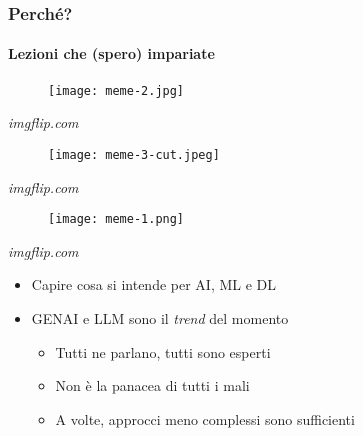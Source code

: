 \begin{frame}[t,fragile] \frametitle{Perché?}
\framesubtitle{Lezioni che (spero) impariate}
{\scriptsize
    \begin{minipage}[b]{\textwidth}
        \begin{minipage}[b]{0.33\textwidth}
            \centering
            \begin{figure}[ht]
                \texttt{[image: meme-2.jpg]}
            \end{figure}
            \begin{flushright}
                \vspace*{-7pt}
                {\tiny\textit{\textcopyright imgflip.com}}
            \end{flushright}
        \end{minipage}
        \begin{minipage}[b]{0.33\textwidth}
            \centering
            \begin{figure}[ht]
                \texttt{[image: meme-3-cut.jpeg]}
            \end{figure}
            \begin{flushright}
                \vspace*{-7pt}
                {\tiny\textit{\textcopyright imgflip.com}}
            \end{flushright}
        \end{minipage}
        \begin{minipage}[b]{0.33\textwidth}
            \centering
            \begin{figure}[ht]
                \texttt{[image: meme-1.png]}
            \end{figure}
            \begin{flushright}
                \vspace*{-7pt}
                {\tiny\textit{\textcopyright imgflip.com}}
            \end{flushright}
        \end{minipage}
    \end{minipage}
    \begin{itemize}[leftmargin=10pt,align=right]
        \item[\alert{\faHandORight}] Capire cosa si intende per AI, ML e DL
        \item[\alert{\faHandORight}] GENAI e LLM sono il \textit{trend} del momento
        \begin{itemize}[leftmargin=10pt,align=right]
            \item[\alert{\faHandORight}] Tutti ne parlano, tutti sono esperti
            \item[\alert{\faHandORight}] \alert{Non} è la panacea di tutti i mali
            \item[\alert{\faHandORight}] A volte, approcci meno complessi sono sufficienti
        \end{itemize}
    \end{itemize}
}
\end{frame}

